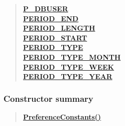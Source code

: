 {{{{{{{{{\begin{verse}
\hyperlink{it.unisa.sesa.repominer.preferences.PreferenceConstants.P_DBUSER}{{\bf P\_DBUSER}} \\
\hyperlink{it.unisa.sesa.repominer.preferences.PreferenceConstants.PERIOD_END}{{\bf PERIOD\_END}} \\
\hyperlink{it.unisa.sesa.repominer.preferences.PreferenceConstants.PERIOD_LENGTH}{{\bf PERIOD\_LENGTH}} \\
\hyperlink{it.unisa.sesa.repominer.preferences.PreferenceConstants.PERIOD_START}{{\bf PERIOD\_START}} \\
\hyperlink{it.unisa.sesa.repominer.preferences.PreferenceConstants.PERIOD_TYPE}{{\bf PERIOD\_TYPE}} \\
\hyperlink{it.unisa.sesa.repominer.preferences.PreferenceConstants.PERIOD_TYPE_MONTH}{{\bf PERIOD\_TYPE\_MONTH}} \\
\hyperlink{it.unisa.sesa.repominer.preferences.PreferenceConstants.PERIOD_TYPE_WEEK}{{\bf PERIOD\_TYPE\_WEEK}} \\
\hyperlink{it.unisa.sesa.repominer.preferences.PreferenceConstants.PERIOD_TYPE_YEAR}{{\bf PERIOD\_TYPE\_YEAR}} \\
\end{verse}
}
\subsubsection{Constructor summary}{
\begin{verse}
\hyperlink{it.unisa.sesa.repominer.preferences.PreferenceConstants()}{{\bf PreferenceConstants()}} \\
\end{verse}
}
}}}}}}}}
